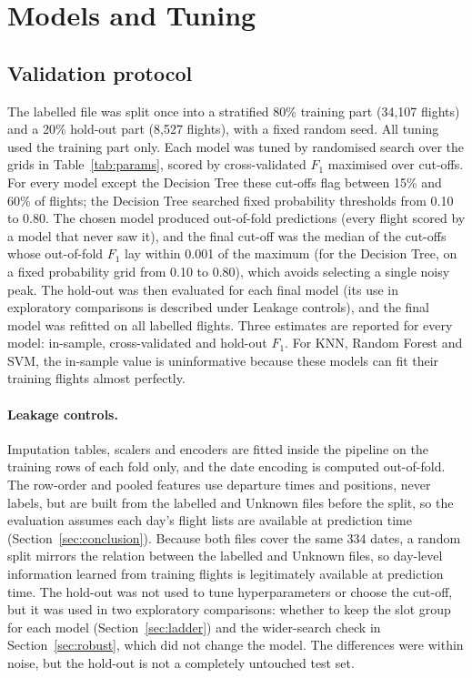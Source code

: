 \documentclass[12pt,a4paper]{article}
\newcommand{\Fone}{$F_1$}
\begin{document}
\section{Models and Tuning}
\subsection{Validation protocol}\label{sec:protocol}
The labelled file was split once into a stratified 80\% training part (34,107 flights) and a 20\% hold-out part (8,527 flights), with a fixed random seed. All tuning used the training part only. Each model was tuned by randomised search over the grids in Table~\ref{tab:params}, scored by cross-validated \Fone{} maximised over cut-offs. For every model except the Decision Tree these cut-offs flag between 15\% and 60\% of flights; the Decision Tree searched fixed probability thresholds from 0.10 to 0.80. The chosen model produced out-of-fold predictions (every flight scored by a model that never saw it), and the final cut-off was the median of the cut-offs whose out-of-fold \Fone{} lay within 0.001 of the maximum (for the Decision Tree, on a fixed probability grid from 0.10 to 0.80), which avoids selecting a single noisy peak. The hold-out was then evaluated for each final model (its use in exploratory comparisons is described under Leakage controls), and the final model was refitted on all labelled flights. Three estimates are reported for every model: in-sample, cross-validated and hold-out \Fone{}. For KNN, Random Forest and SVM, the in-sample value is uninformative because these models can fit their training flights almost perfectly.

\paragraph{Leakage controls.} Imputation tables, scalers and encoders are fitted inside the pipeline on the training rows of each fold only, and the date encoding is computed out-of-fold. The row-order and pooled features use departure times and positions, never labels, but are built from the labelled and Unknown files before the split, so the evaluation assumes each day's flight lists are available at prediction time (Section~\ref{sec:conclusion}). Because both files cover the same 334 dates, a random split mirrors the relation between the labelled and Unknown files, so day-level information learned from training flights is legitimately available at prediction time. The hold-out was not used to tune hyperparameters or choose the cut-off, but it was used in two exploratory comparisons: whether to keep the slot group for each model (Section~\ref{sec:ladder}) and the wider-search check in Section~\ref{sec:robust}, which did not change the model. The differences were within noise, but the hold-out is not a completely untouched test set.
\end{document}
